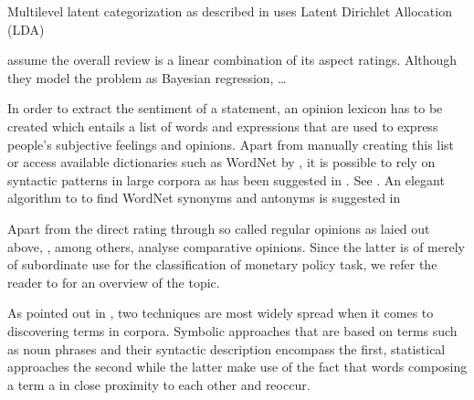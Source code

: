 Multilevel latent categorization as described in \textcite{Guo.2009} uses Latent Dirichlet Allocation (LDA) 


\textcite{Wang.2010} assume the overall review is a linear combination of its aspect ratings. Although they model the problem as Bayesian regression, \dots %

In order to extract the sentiment of a statement, an opinion lexicon has to be created which entails a list of words and expressions that are used to express people's subjective feelings and opinions. Apart from manually creating this list or access available dictionaries such as WordNet\textsuperscript{\textregistered} by \textcite{Fellbaum.1998,Esuli.2006}, it is possible to rely on syntactic patterns in large corpora as has been suggested in \textcite{Ding.2008,Hatzivassiloglou.1997,Kanayama.2006,Turney.2002,Yu.2003}. See \textcite{Feldman.2013}. An elegant algorithm to to find WordNet\textsuperscript{\textregistered} synonyms and antonyms is suggested in \textcite{Kamps.2004} %

Apart from the direct rating through so called regular opinions as laied out above, \textcite{Ding.2009,Ganapathibhotla.2008,Jindal.2006}, among others, analyse comparative opinions. Since the latter is of merely of subordinate use for the classification of monetary policy task, we refer the reader to \textcite{Liu.2012} for an overview of the topic. 

%
As pointed out in \textcite{Hu.2004}, two techniques are most widely spread when it comes to discovering terms in corpora. Symbolic approaches that are based on terms such as noun phrases and their syntactic description encompass the first, statistical approaches the second while the latter make use of the fact that words composing a term a in close proximity to each other and reoccur. 


